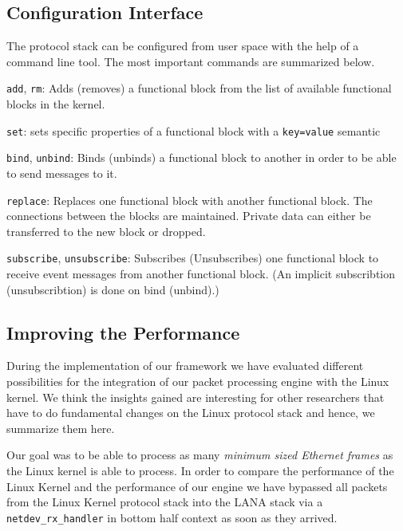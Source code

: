 \documentclass{sig-alternate}
\begin{document}
\subsection{Configuration Interface}
The protocol stack can be configured from user space with the help of a 
command line tool. The most important commands are summarized below.
\begin{compactitem}
\item \texttt{add}, \texttt{rm}: Adds (removes) a functional block from the 
      list of available functional blocks in the kernel. 
\item \texttt{set}: sets specific properties of a functional block with a 
      \texttt{key=value} semantic
\item \texttt{bind}, \texttt{unbind}: Binds (unbinds) a functional block 
      to another in order to be able to send messages to it. 
\item \texttt{replace}: Replaces one functional block with another 
      functional block. The connections between the blocks are maintained. 
      Private data can either be transferred to the new block or dropped.
\item \texttt{subscribe}, \texttt{unsubscribe}: Subscribes (Unsubscribes) one 
      functional block to receive event messages from another functional block.
      (An implicit subscribtion (unsubscribtion) is done on bind (unbind).)
\end{compactitem}

\subsection{Improving the Performance}
During the implementation of our framework we have evaluated different 
possibilities for the integration of our packet processing engine with the 
Linux kernel. We think the insights gained are interesting for other 
researchers that have to do fundamental changes on the Linux protocol stack 
and hence, we summarize them here.

Our goal was to be able to process as many \textit{minimum sized Ethernet frames} 
as the Linux kernel is able to process. In order to compare the performance of 
the Linux Kernel and the performance of our engine we have bypassed all packets 
from the Linux Kernel protocol stack into the LANA stack via a
\texttt{netdev\_rx\_handler} in bottom half context as soon as they arrived.
\end{document}
